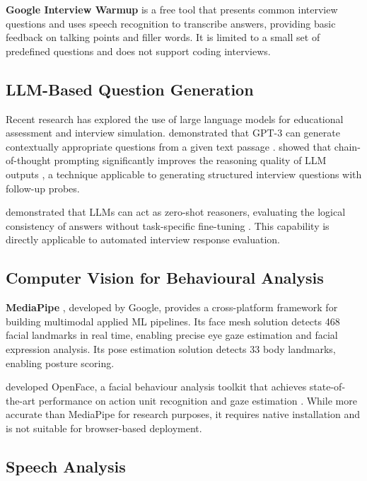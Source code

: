 \textbf{Google Interview Warmup} \cite{googleinterviewwarmup2024} is a free tool that presents common interview questions and uses speech recognition to transcribe answers, providing basic feedback on talking points and filler words. It is limited to a small set of predefined questions and does not support coding interviews.

\subsection{LLM-Based Question Generation}

Recent research has explored the use of large language models for educational assessment and interview simulation. \citeauthor{brown2020language} demonstrated that GPT-3 can generate contextually appropriate questions from a given text passage \cite{brown2020language}. \citeauthor{wei2022chain} showed that chain-of-thought prompting significantly improves the reasoning quality of LLM outputs \cite{wei2022chain}, a technique applicable to generating structured interview questions with follow-up probes.

\citeauthor{kojima2022large} demonstrated that LLMs can act as zero-shot reasoners, evaluating the logical consistency of answers without task-specific fine-tuning \cite{kojima2022large}. This capability is directly applicable to automated interview response evaluation.

\subsection{Computer Vision for Behavioural Analysis}

\textbf{MediaPipe} \cite{mediapipe2023}, developed by Google, provides a cross-platform framework for building multimodal applied ML pipelines. Its face mesh solution detects 468 facial landmarks in real time, enabling precise eye gaze estimation and facial expression analysis. Its pose estimation solution detects 33 body landmarks, enabling posture scoring.

\citeauthor{baltrusaitis2018openface} developed OpenFace, a facial behaviour analysis toolkit that achieves state-of-the-art performance on action unit recognition and gaze estimation \cite{baltrusaitis2018openface}. While more accurate than MediaPipe for research purposes, it requires native installation and is not suitable for browser-based deployment.

\subsection{Speech Analysis}

